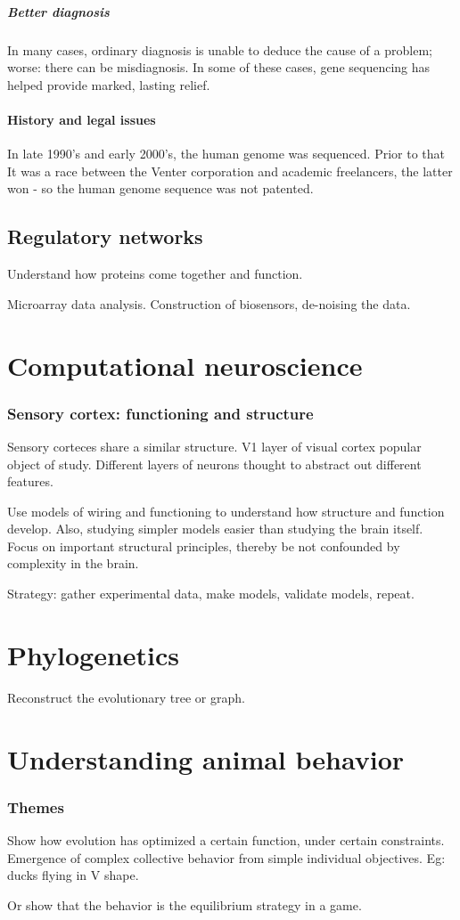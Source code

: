 \documentclass[oneside, article]{memoir}
\begin{document}
\subsubsection{Better diagnosis}
In many cases, ordinary diagnosis is unable to deduce the cause of a problem; worse: there can be misdiagnosis. In some of these cases, gene sequencing has helped provide marked, lasting relief.

\subsection{History and legal issues}
In late 1990's and early 2000's, the human genome was sequenced. Prior to that It was a race between the Venter corporation and academic freelancers, the latter won - so the human genome sequence was not patented.

\chapter{Regulatory networks}
Understand how proteins come together and function.

Microarray data analysis. Construction of biosensors, de-noising the data.

\part{Computational neuroscience}
\section{Sensory cortex: functioning and structure}
Sensory corteces share a similar structure. V1 layer of visual cortex popular object of study. Different layers of neurons thought to abstract out different features.

Use models of wiring and functioning to understand how structure and function develop. Also, studying simpler models easier than studying the brain itself. Focus on important structural principles, thereby be not confounded by complexity in the brain.

Strategy: gather experimental data, make models, validate models, repeat.

\part{Phylogenetics}
Reconstruct the evolutionary tree or graph.

\part{Understanding animal behavior}
\section{Themes}
Show how evolution has optimized a certain function, under certain constraints. Emergence of complex collective behavior from simple individual objectives. Eg: ducks flying in V shape.

Or show that the behavior is the equilibrium strategy in a game.

% 
% 
\end{document}

